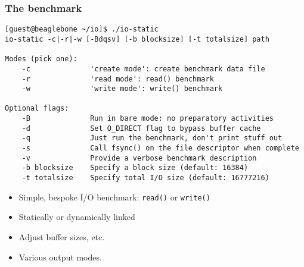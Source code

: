 \begin{frame}[fragile]
  \frametitle{The benchmark}

  \begin{scriptsize}
\begin{verbatim}
[guest@beaglebone ~/io]$ ./io-static 
io-static -c|-r|-w [-Bdqsv] [-b blocksize] [-t totalsize] path

Modes (pick one):
    -c              'create mode': create benchmark data file
    -r              'read mode': read() benchmark
    -w              'write mode': write() benchmark

Optional flags:
    -B              Run in bare mode: no preparatory activities
    -d              Set O_DIRECT flag to bypass buffer cache
    -q              Just run the benchmark, don't print stuff out
    -s              Call fsync() on the file descriptor when complete
    -v              Provide a verbose benchmark description
    -b blocksize    Specify a block size (default: 16384)
    -t totalsize    Specify total I/O size (default: 16777216)
\end{verbatim}
  \end{scriptsize}

  \begin{itemize}
    \item Simple, bespoke I/O benchmark: \texttt{read()} or \texttt{write()}
    \item Statically or dynamically linked
    \item Adjust buffer sizes, etc.
    \item Various output modes.
  \end{itemize}
\end{frame}

